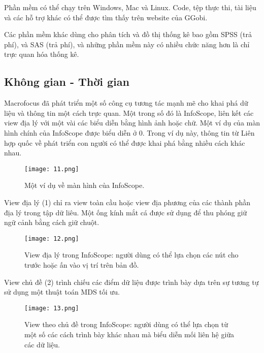 \documentclass[13pt]{scrartcl} %
\begin{document}
Phần mềm có thể chạy trên Windows, Mac và Linux. Code, tệp thực thi, tài liệu và các hỗ trợ khác có thể được tìm thấy trên website của GGobi.

Các phần mềm khác dùng cho phân tích và đồ thị thống kê bao gồm SPSS (trả phí), và SAS (trả phí), và những phần mềm này có nhiều chức năng hơn là chỉ trực quan hóa thống kê.



\subsection{Không gian - Thời gian}
Macrofocus đã phát triển một số công cụ tương tác mạnh mẽ cho khai phá dữ liệu và thông tin một cách trực quan. Một trong số đó là InfoScope, liên kết các view địa lý với một vài các biểu diễn bằng hình ảnh hoặc chữ. Một ví dụ của màn hình chính của InfoScope được biểu diễn ở 0. Trong ví dụ này, thông tin từ Liên hợp quốc về phát triển con người có thể được khai phá bằng nhiều cách khác nhau.

\begin{figure}[!ht] %
    \centering
    \texttt{[image: 11.png]}
    \caption{Một ví dụ về màn hình của InfoScope.}
\end{figure}

View địa lý (1) chỉ ra view toàn cầu hoặc view địa phương của các thành phần địa lý trong tập dữ liêu. Một ống kính mắt cá được sử dụng để thu phóng giữ ngữ cảnh bằng cách giữ chuột.

\begin{figure}[!ht] %
    \centering
    \texttt{[image: 12.png]}
    \caption{View địa lý trong InfoScope: người dùng có thể lựa chọn các nút cho trước hoặc ấn vào vị trí trên bản đồ.}
\end{figure}

View chủ đề (2) trình chiếu các điểm dữ liệu được trình bày dựa trên sự tương tự sử dụng một thuật toán MDS tối ưu.

\begin{figure}[!ht] %
    \centering
    \texttt{[image: 13.png]}
    \caption{View theo chủ đề trong InfoScope: người dùng có thể lựa chọn từ một số các cách trình bày khác nhau mà biểu diễn mối liên hệ giữa các dữ liệu.}
\end{figure}
\end{document}
